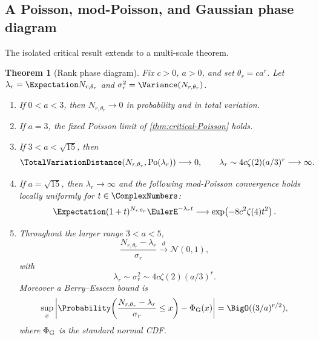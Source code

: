 \documentclass[11pt,oneside]{article}
\newtheorem{theorem}{Theorem}[section]
\theoremstyle{definition}
\theoremstyle{remark}
\newcommand{\Po}{\operatorname{Po}}
\newcommand{\Normal}{\mathcal N}
\begin{document}
\subsection{A Poisson, mod-Poisson, and Gaussian phase diagram}

The isolated critical result extends to a multi-scale theorem.

\begin{theorem}[Rank phase diagram]\label{thm:PB-phase}
Fix $c>0$, $a>0$, and set $\theta_r=ca^r$.  Let
$\lambda_r=\Expectation N_{r,\theta_r}$ and
$\sigma_r^2=\Variance(N_{r,\theta_r})$.

\begin{enumerate}[label=(\roman*)]
\item If $0<a<3$, then $N_{r,\theta_r}\to0$ in probability and in total
variation.

\item If $a=3$, the fixed Poisson limit of
\cref{thm:critical-Poisson} holds.

\item If $3<a<\sqrt{15}$, then
\begin{equation}\label{eq:diverging-Poisson}
 \TotalVariationDistance(N_{r,\theta_r},\Po(\lambda_r))\longrightarrow0,
 \qquad
 \lambda_r\sim4c\zeta(2)(a/3)^r\longrightarrow\infty.
\end{equation}

\item If $a=\sqrt{15}$, then $\lambda_r\to\infty$ and the following
mod-Poisson convergence holds locally uniformly for $t\in\ComplexNumbers$:
\begin{equation}\label{eq:mod-Poisson}
 \Expectation(1+t)^{N_{r,\theta_r}}\EulerE^{-\lambda_rt}
 \longrightarrow
 \exp\!\left(-8c^2\zeta(4)t^2\right).
\end{equation}

\item Throughout the larger range $3<a<5$,
\begin{equation}\label{eq:PB-CLT}
 \frac{N_{r,\theta_r}-\lambda_r}{\sigma_r}
 \xrightarrow{d}\Normal(0,1),
\end{equation}
with
\begin{equation}\label{eq:mean-var-asymp}
 \lambda_r\sim\sigma_r^2\sim4c\zeta(2)(a/3)^r.
\end{equation}
Moreover a Berry--Esseen bound is
\begin{equation}\label{eq:PB-BE}
 \sup_x\left|\Probability\!\left(
 \frac{N_{r,\theta_r}-\lambda_r}{\sigma_r}\leq x\right)-\Phi_{\rm G}(x)
 \right|=\BigO((3/a)^{r/2}),
\end{equation}
where $\Phi_{\rm G}$ is the standard normal CDF.
\end{enumerate}
\end{theorem}
\end{document}
